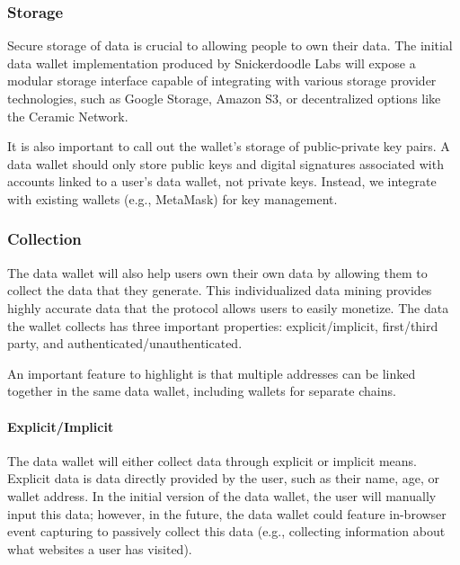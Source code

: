 \subsubsection{Storage}
Secure storage of data is crucial to allowing people to own their data. The initial data wallet implementation produced by 
Snickerdoodle Labs will expose a modular storage interface capable of integrating with various storage provider technologies, 
such as Google Storage, Amazon S3, or decentralized options like the Ceramic Network.

It is also important to call out the wallet's storage of public-private key pairs. A data wallet should only store public keys 
and digital signatures associated with accounts linked to a user's data wallet, not private keys. 
Instead, we integrate with existing wallets (e.g., MetaMask) for key management.


\subsubsection{Collection}
The data wallet will also help users own their own data by allowing them to collect the data that they generate. This individualized data mining 
provides highly accurate data that the protocol allows users to easily monetize. The data the wallet collects has three important properties: 
explicit/implicit, first/third party, and authenticated/unauthenticated. %

An important feature to highlight is that multiple addresses can be linked together in the same data wallet, including wallets for separate chains. 

\paragraph{Explicit/Implicit}
The data wallet will either collect data through explicit or implicit means. Explicit data is data directly provided by the user, such as their name, 
age, or wallet address. In the initial version of the data wallet, the user will manually input this data; however, in the future, the data wallet 
could feature in-browser event capturing to passively collect this data (e.g., collecting information about what websites a user has visited).


